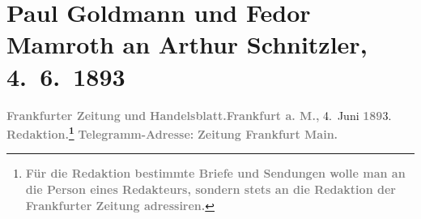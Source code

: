 

         
         \newcommand{\erwaehntePersonen}{Personen: Samuel Fischer, Carl Freund, Wilhelm Friedrich, Max Jeckel, Edgar Pierson, Salo Schottlaender}
         \newcommand{\erwaehnteInstitutionen}{Institutionen: E. Pierson’s Verlag, Frankfurter Zeitung, Freund & Jeckel, S. Fischer Verlag, S. Schottländer, Verlag Wilhelm Friedrich}
         \newcommand{\erwaehnteOrte}{Orte: Altonaer Straße, Berlin, Breslau, Dresden, Frankfurt am Main, Köthenerstraße, Leipzig, Wien}
         \newcommand{\erwaehnteWerke}{Werke: Frankfurter Zeitung}
               \section[Paul Goldmann und Fedor Mamroth an Arthur Schnitzler, 4. 6. 1893]{ Paul Goldmann und Fedor Mamroth an Arthur Schnitzler,
               4. 6. 1893}\nopagebreak{}\rehead{ }\begin{ledgroupsized}[t]{13cm}\normalsize\beginnumbering \toendnotes[C]{\smallbreak\pagebreak[2]} 
\toendnotes[C]{\smallbreak}\pstart
           \noindent{}{\pb}\textcolor{gray}{\textbf{\textbf{Frankfurter Zeitung}}}\pend
           \pstart
           \textcolor{gray}{\textbf{und}}\pend
           \pstart
           \textcolor{gray}{\textbf{\textbf{Handelsblatt}.}}\hfill \textcolor{gray}{\textbf{Frankfurt a. M.,}}{ }4. Juni \textcolor{gray}{\textbf{189}}3.\pend
           \pstart
           \textcolor{gray}{\textbf{\textbf{Redaktion.}\footnote{\noindent{}\textcolor{gray}{\textbf{Für die Redaktion bestimmte Briefe und Sendungen wolle
                              man  an die Person eines Redakteurs,
                              sondern stets \textbf{an die Redaktion der Frankfurter Zeitung} adressiren.}}}}}\pend
           \pstart
           \textcolor{gray}{\textbf{\textbf{Telegramm-Adresse:}}}\pend
           \pstart
           \textcolor{gray}{\textbf{\textbf{Zeitung Frankfurt
                        Main.}}}\pend

\end{ledgroupsized}
